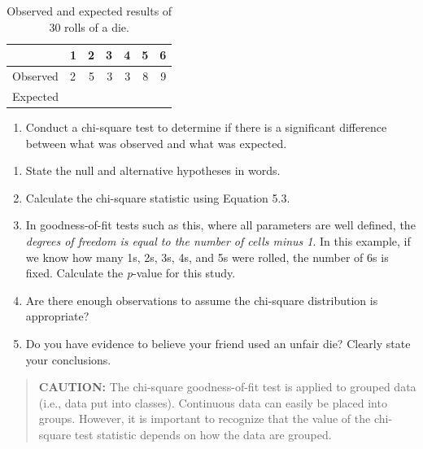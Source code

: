 \documentclass[
]{book}
\providecommand{\tightlist}{%
  \setlength{\itemsep}{0pt}\setlength{\parskip}{0pt}}
\begin{document}
\begin{table}[!h]
\centering
\caption{\label{tab:tab58} Observed and expected results of 30 rolls of a die.}
\centering
\begin{tabular}[t]{llrrrrr}
\toprule
  & 1 & 2 & 3 & 4 & 5 & 6\\
\midrule
Observed & 2 & 5 & 3 & 3 & 8 & 9\\
Expected &  &  &  &  &  & \\
\bottomrule
\end{tabular}
\end{table}

\begin{enumerate}
\def\labelenumi{\arabic{enumi}.}
\setcounter{enumi}{33}
\tightlist
\item
  Conduct a chi-square test to determine if there is a significant difference between what was observed and what was expected.\\
\end{enumerate}

\begin{enumerate}
\def\labelenumi{\alph{enumi}.}
\tightlist
\item
  State the null and alternative hypotheses in words.\\
\item
  Calculate the chi-square statistic using Equation 5.3.\\
\item
  In goodness-of-fit tests such as this, where all parameters are well defined, the \emph{degrees of freedom is equal to the number of cells minus 1}. In this example, if we know how many 1s, 2s, 3s, 4s, and 5s were rolled, the number of 6s is fixed. Calculate the \emph{p}-value for this study.\\
\item
  Are there enough observations to assume the chi-square distribution is appropriate?\\
\item
  Do you have evidence to believe your friend used an unfair die? Clearly state your conclusions.
\end{enumerate}

\begin{quote}
\textbf{CAUTION:}
The chi-square goodness-of-fit test is applied to grouped data (i.e., data put into classes). Continuous data can easily be placed into groups. However, it is important to recognize that the value of the chi-square test statistic depends on how the data are grouped.
\end{quote}
\end{document}
